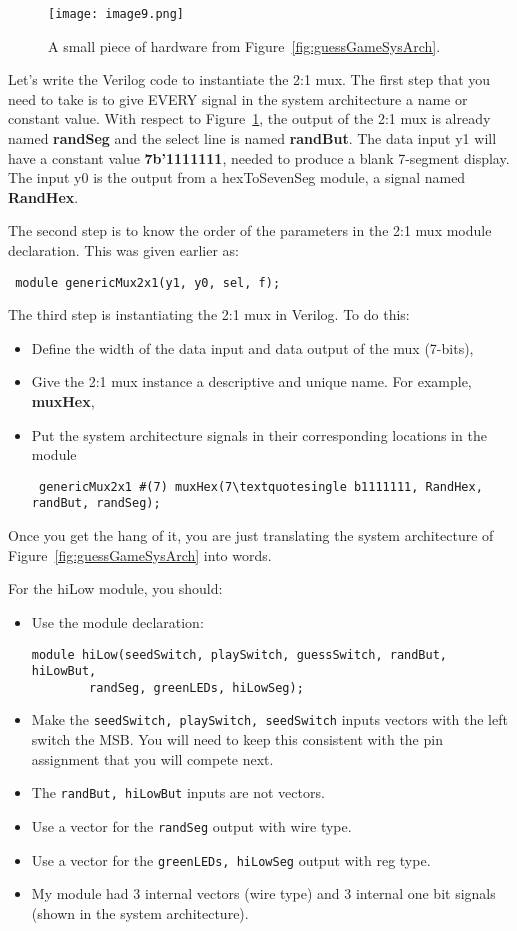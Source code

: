 \begin{figure}[ht]
\texttt{[image: image9.png]}
\caption{A small piece of hardware from Figure~\ref{fig:guessGameSysArch}.}
\label{fig:snippetFromSysArch}
\end{figure}

Let's write the Verilog code to instantiate the 2:1 mux.
The first step that you need to take is to give EVERY signal in the
system architecture a name or constant value. With respect to Figure~\ref{fig:snippetFromSysArch},
the output of the 2:1 mux is already named \textbf{randSeg} and the
select line is named \textbf{randBut}. The data input y1 will have a
constant value \textbf{7b'1111111}, needed to produce a blank 7-segment
display. The input y0 is the output from a hexToSevenSeg module, a signal
named \textbf{RandHex}.

The second step is to know the order of the parameters in the 2:1 mux
module declaration. This was given earlier as:

\verb+ module genericMux2x1(y1, y0, sel, f); +

The third step is instantiating the 2:1 mux in Verilog. To do this:

\begin{itemize}
\item
Define the width of the data input and data output of the mux
(7-bits),
\item
Give the 2:1 mux instance a descriptive and unique name.
For example, \textbf{muxHex},
\item
Put the system architecture signals in their corresponding locations
in the module

\verb+ genericMux2x1 #(7) muxHex(7\textquotesingle b1111111, RandHex, randBut, randSeg); +
\end{itemize}

Once you get the hang of it, you are just translating the system
architecture of Figure~\ref{fig:guessGameSysArch} into words.

For the hiLow module, you should:

\begin{itemize}
\item
Use the module declaration:

\begin{verbatim}
module hiLow(seedSwitch, playSwitch, guessSwitch, randBut, hiLowBut,
        randSeg, greenLEDs, hiLowSeg);
\end{verbatim}

\item
Make the \verb+seedSwitch, playSwitch, seedSwitch+ inputs vectors with the
left switch the MSB. You will need to keep this consistent with the
pin assignment that you will compete next.
\item
The \verb+randBut, hiLowBut+ inputs are not vectors.
\item
Use a vector for the \verb+randSeg+ output with wire type.
\item
Use a vector for the \verb+greenLEDs, hiLowSeg+ output with reg type.
\item
My module had 3 internal vectors (wire type) and 3 internal one bit
signals (shown in the system architecture).
\end{itemize}

